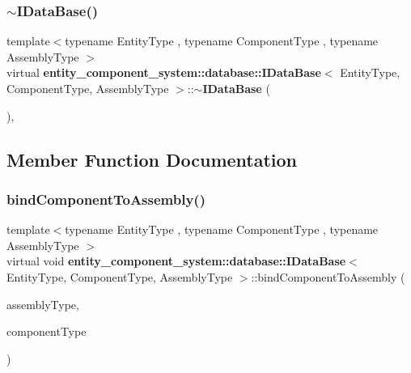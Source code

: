 \subsubsection{$\sim$\+I\+Data\+Base()}
{\footnotesize\ttfamily template$<$typename Entity\+Type , typename Component\+Type , typename Assembly\+Type $>$ \\
virtual {\bf entity\+\_\+component\+\_\+system\+::database\+::\+I\+Data\+Base}$<$ Entity\+Type, Component\+Type, Assembly\+Type $>$\+::$\sim${\bf I\+Data\+Base} (\begin{DoxyParamCaption}\item[{void}]{ }\end{DoxyParamCaption})\hspace{0.3cm}{\ttfamily [inline]}, {\ttfamily [virtual]}}



\subsection{Member Function Documentation}
\label{classentity__component__system_1_1database_1_1_i_data_base_a6f9eb76615a1bea6d93f562ca2380bae} 
\subsubsection{bind\+Component\+To\+Assembly()}
{\footnotesize\ttfamily template$<$typename Entity\+Type , typename Component\+Type , typename Assembly\+Type $>$ \\
virtual void {\bf entity\+\_\+component\+\_\+system\+::database\+::\+I\+Data\+Base}$<$ Entity\+Type, Component\+Type, Assembly\+Type $>$\+::bind\+Component\+To\+Assembly (\begin{DoxyParamCaption}\item[{Assembly\+Type const}]{assembly\+Type,  }\item[{Component\+Type const}]{component\+Type }\end{DoxyParamCaption})\hspace{0.3cm}{\ttfamily [pure virtual]}}

\label{classentity__component__system_1_1database_1_1_i_data_base_a3fa3416dbb90294924923df7a67db356} 
